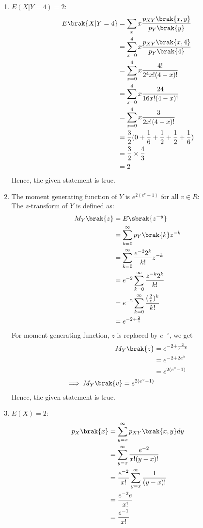 \documentclass[journal,12pt,twocolumn]{IEEEtran}
\theoremstyle{remark}
\begin{document}
\begin{enumerate}
\item ${E(X|Y = 4) = 2}$:
\begin{align}
E\brak{X|Y=4} &= \sum_{x} x\frac{p_{XY}\brak{x,y}}{p_Y\brak{y}}\\
&= \sum_{x=0}^{4} x\frac{p_{XY}\brak{x,4}}{p_Y\brak{4}}\\
&= \sum_{x=0}^{4} x\frac{4!}{2^4 x!(4-x)!}\\
&= \sum_{x=0}^{4} x\frac{24}{16 x!(4-x)!}\\
&= \sum_{x=0}^{4} x\frac{3}{2 x!(4-x)!}\\
&= \frac{3}{2}(0 + \frac{1}{6} + \frac{1}{2} + \frac{1}{2} + \frac{1}{6})\\
&= \frac{3}{2}\times \frac{4}{3}\\
&= 2
\end{align}
Hence, the given statement is true.
\item The moment generating function of $Y$ is $e^{2(e^v - 1)}$ for all $v \in R$:\\
The $z$-transform of $Y$ is defined as:
\begin{align}
M_Y\brak{z} &= E\sbrak{z^{-y}}\\
&= \sum_{k=0}^{\infty} p_Y\brak{k}z^{-k}\\
&= \sum_{k=0}^{\infty} \frac{e^{-2}2^k}{k!}z^{-k}\\
&= e^{-2} \sum_{k=0}^{\infty} \frac{z^{-k}2^k}{k!}\\
&= e^{-2} \sum_{k=0}^{\infty} \frac{(\frac{2}{z})^k}{k!}\\
&= e^{-2+\frac{2}{z}}
\end{align}
For moment generating function, $z$ is replaced by $e^{-z}$, we get
\begin{align}
M_Y\brak{z} &= e^{-2+\frac{2}{e^{-z}}}\\
&= e^{-2+2e^z}\\
&= e^{2(e^z-1)}\\
\implies M_Y\brak{v} = e^{2(e^v-1)} 
\end{align}
Hence, the given statement is true.
\item ${E(X) = 2}$:
\begin{align}
p_X\brak{x} &= \sum_{y=x}^{\infty}p_{XY}\brak{x,y}dy\\
&= \sum_{y=x}^{\infty} \frac{e^{-2}}{x!(y - x)!}\\
&= \frac{e^{-2}}{x!}\sum_{y=x}^{\infty}\frac{1}{(y - x)!}\\
&= \frac{e^{-2}e}{x!}\\
&= \frac{e^{-1}}{x!}

\end{align}
\end{enumerate}
\end{document}
